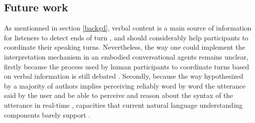 \subsection{Future work}

As mentionned in section \ref{backgd}, verbal content is a main source of information for listeners to detect ends of turn \cite{de_ruiter_projecting_2006}, and should considerably help participants to coordinate their speaking turns. Nevertheless, the way one could implement the interpretation mechanism in an embodied conversational agents remains unclear, firstly because the process used by human participants to coordinate turns based on verbal information is still debated \citep{heldner_pauses_2010,magyari_prediction_2012,riest_anticipation_2015}. Secondly, because the way hypothesized by a majority of authors implies perceiving reliably word by word the utterance said by the user and be able to perceive and reason about the syntax of the utterance in real-time \citep{sacks_simplest_1974}, capacities that current natural language understanding components barely support \cite{de_vault_incremental_2011}.


